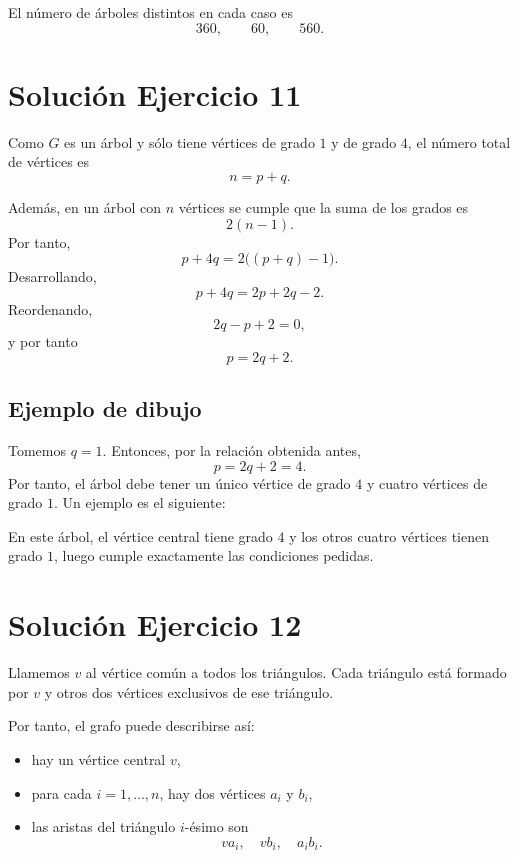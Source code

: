 \documentclass[12pt]{article}
\begin{document}
El número de árboles distintos en cada caso es
\[
\boxed{360,\qquad 60,\qquad 560.}
\]

\section*{Solución Ejercicio 11}

Como \(G\) es un árbol y sólo tiene vértices de grado \(1\) y de grado \(4\), el número total de vértices es
\[
n=p+q.
\]

Además, en un árbol con \(n\) vértices se cumple que la suma de los grados es
\[
2(n-1).
\]
Por tanto,
\[
p+4q=2\bigl((p+q)-1\bigr).
\]
Desarrollando,
\[
p+4q=2p+2q-2.
\]
Reordenando,
\[
2q-p+2=0,
\]
y por tanto
\[
\boxed{p=2q+2.}
\]

\subsection*{Ejemplo de dibujo}

Tomemos \(q=1\). Entonces, por la relación obtenida antes,
\[
p=2q+2=4.
\]
Por tanto, el árbol debe tener un único vértice de grado \(4\) y cuatro vértices de grado \(1\). Un ejemplo es el siguiente:

\begin{center}
\end{center}

En este árbol, el vértice central tiene grado \(4\) y los otros cuatro vértices tienen grado \(1\), luego cumple exactamente las condiciones pedidas.

\section*{Solución Ejercicio 12}

Llamemos \(v\) al vértice común a todos los triángulos. Cada triángulo está formado por \(v\) y otros dos vértices exclusivos de ese triángulo.

Por tanto, el grafo puede describirse así:
\begin{itemize}
    \item hay un vértice central \(v\),
    \item para cada \(i=1,\dots,n\), hay dos vértices \(a_i\) y \(b_i\),
    \item las aristas del triángulo \(i\)-ésimo son
    \[
    va_i,\quad vb_i,\quad a_ib_i.
    \]
\end{itemize}
\end{document}
